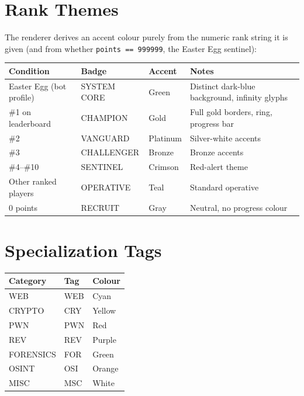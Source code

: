 \documentclass[12pt,a4paper]{report}
\begin{document}
\section{Rank Themes}

The renderer derives an accent colour purely from the numeric rank string it is given (and from
whether \texttt{points == 999999}, the Easter Egg sentinel):

\begin{center}
\begin{tabular}{l l l p{4.5cm}}
\toprule
\textbf{Condition} & \textbf{Badge} & \textbf{Accent} & \textbf{Notes} \\
\midrule
Easter Egg (bot profile) & SYSTEM CORE & Green    & Distinct dark-blue background, infinity glyphs \\
\#1 on leaderboard        & CHAMPION    & Gold      & Full gold borders, ring, progress bar \\
\#2                       & VANGUARD    & Platinum  & Silver-white accents \\
\#3                       & CHALLENGER  & Bronze    & Bronze accents \\
\#4--\#10                 & SENTINEL    & Crimson   & Red-alert theme \\
Other ranked players      & OPERATIVE   & Teal      & Standard operative \\
0 points                  & RECRUIT     & Gray      & Neutral, no progress colour \\
\bottomrule
\end{tabular}
\end{center}

\section{Specialization Tags}

\begin{center}
\begin{tabular}{l l l}
\toprule
\textbf{Category} & \textbf{Tag} & \textbf{Colour} \\
\midrule
WEB       & WEB & Cyan    \\
CRYPTO    & CRY & Yellow  \\
PWN       & PWN & Red     \\
REV       & REV & Purple  \\
FORENSICS & FOR & Green   \\
OSINT     & OSI & Orange  \\
MISC      & MSC & White   \\
\bottomrule
\end{tabular}
\end{center}
\end{document}
